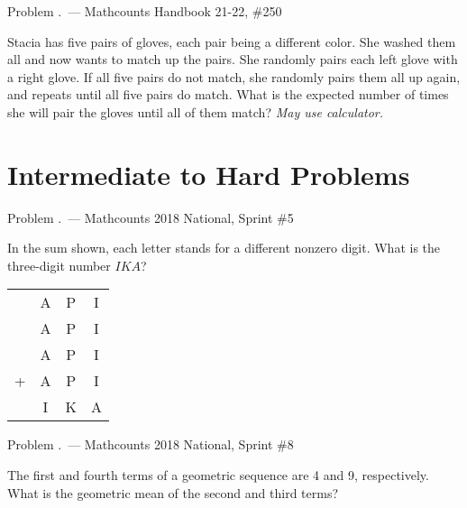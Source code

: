 \documentclass[9pt]{beamer}
\newcounter{problem}[section]
\begin{document}
\begin{frame}[t, fragile]{Problem \thesection.\theproblem\ ---  Mathcounts Handbook 21-22, \#250}
    \begin{block}{}
    Stacia has five pairs of gloves, each pair being a different color. She washed them all and now wants to match up the pairs. She randomly pairs each left glove with a right glove. If all five pairs do not match, she randomly pairs them all up again, and repeats until all five pairs do match. What is the expected number of times she will pair the gloves until all of them match? \textit{May use calculator.}
	
    \end{block}
\end{frame}


\section{Intermediate to Hard Problems}

\begin{frame}[t, fragile]{Problem \thesection.\theproblem\ ---  Mathcounts 2018 National, Sprint \#5}
    \begin{block}{}
    In the sum shown, each letter stands for a different nonzero digit. What is the three-digit number $ IKA $?
    

\end{block}
\begin{center}
        \begin{tabular}{cccc}
            & A& P & I \\ 
            & A& P & I \\ 
            & A& P & I \\ 
            + & A& P & I \\ \hline
            & I & K & A
    
        \end{tabular}        
    \end{center}

\end{frame}

\begin{frame}[t, fragile]{Problem \thesection.\theproblem\ ---  Mathcounts 2018 National, Sprint \#8}
    \begin{block}{}
    The first and fourth terms of a geometric sequence are 4 and 9, respectively. What is the geometric mean of the second and third terms?
    
    \end{block}
\end{frame}
\end{document}
